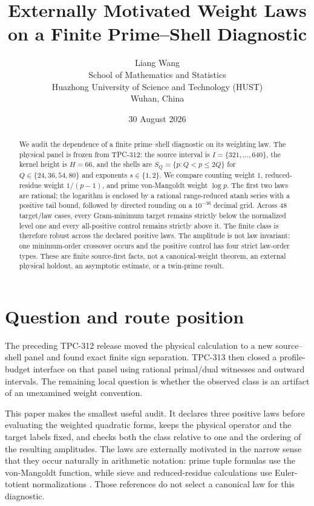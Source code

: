 \documentclass[10pt,a4paper]{article}
\title{Externally Motivated Weight Laws on a Finite Prime--Shell Diagnostic}
\author{Liang Wang\\
School of Mathematics and Statistics\\
Huazhong University of Science and Technology (HUST)\\
Wuhan, China}
\date{30 August 2026}
\begin{document}
\maketitle

\begin{abstract}
We audit the dependence of a finite prime--shell diagnostic on its weighting
law.  The physical panel is frozen from TPC-312: the source interval is
$I=\{321,\ldots,640\}$, the kernel height is $H=66$, and the shells are
$S_Q=\{p:Q<p\leq 2Q\}$ for $Q\in\{24,36,54,80\}$ and exponents
$s\in\{1,2\}$.  We compare counting weight $1$, reduced-residue weight
$1/(p-1)$, and prime von-Mangoldt weight $\log p$.  The first two laws are
rational; the logarithm is enclosed by a rational range-reduced atanh series
with a positive tail bound, followed by directed rounding on a $10^{-36}$
decimal grid.  Across 48 target/law cases, every Gram-minimum target remains
strictly below the normalized level one and every all-positive control remains
strictly above it.  The finite class is therefore robust across the declared
positive laws.  The amplitude is not law invariant: one minimum-order
crossover occurs and the positive control has four strict law-order types.
These are finite source-first facts, not a canonical-weight theorem, an
external physical holdout, an asymptotic estimate, or a twin-prime result.
\end{abstract}

\section{Question and route position}

The preceding TPC-312 release moved the physical calculation to a new
source--shell panel and found exact finite sign separation.  TPC-313 then
closed a profile-budget interface on that panel using rational primal/dual
witnesses and outward intervals.  The remaining local question is whether
the observed class is an artifact of an unexamined weight convention.

This paper makes the smallest useful audit.  It declares three positive laws
before evaluating the weighted quadratic forms, keeps the physical operator
and the target labels fixed, and checks both the class relative to one and the
ordering of the resulting amplitudes.  The laws are externally motivated in
the narrow sense that they occur naturally in arithmetic notation: prime
tuple formulas use the von-Mangoldt function, while sieve and
reduced-residue calculations use Euler-totient normalizations
\cite{cantarini2018,revesz2021,banksfordtao2023}.  Those references do not
select a canonical law for this diagnostic.
\end{document}
